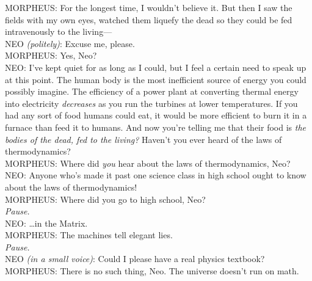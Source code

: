 \begin{playdialog}
MORPHEUS: For the longest time, I wouldn’t believe it. But then I saw the fields with my own eyes, watched them liquefy the dead so they could be fed intravenously to the living—\\

NEO \emph{(politely)}: Excuse me, please.\\

MORPHEUS: Yes, Neo?\\

NEO: I’ve kept quiet for as long as I could, but I feel a certain need to speak up at this point. The human body is the most inefficient source of energy you could possibly imagine. The efficiency of a power plant at converting thermal energy into electricity \emph{decreases} as you run the turbines at lower temperatures. If you had any sort of food humans could eat, it would be more efficient to burn it in a furnace than feed it to humans. And now you’re telling me that their food is \emph{the bodies of the dead, fed to the living?} Haven’t you ever heard of the laws of thermodynamics?\\

MORPHEUS: Where did \emph{you} hear about the laws of thermodynamics, Neo?\\

NEO: Anyone who’s made it past one science class in high school ought to know about the laws of thermodynamics!\\

MORPHEUS: Where did you go to high school, Neo?\\

\emph{Pause.}\\

NEO: …in the Matrix.\\

MORPHEUS: The machines tell elegant lies.\\

\emph{Pause.}\\

NEO \emph{(in a small voice)}: Could I please have a real physics textbook?\\

MORPHEUS: There is no such thing, Neo. The universe doesn’t run on math.\\ \end{playdialog}

